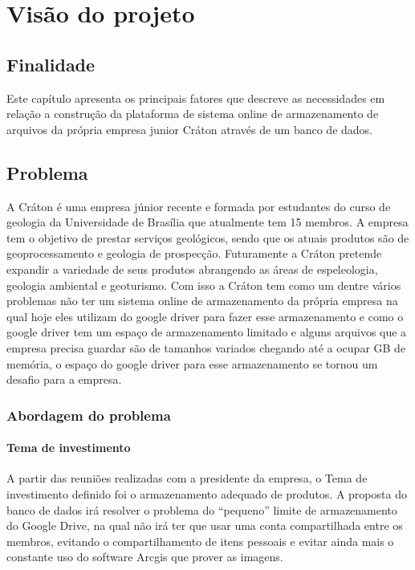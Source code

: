 \chapter{Visão do projeto}

  \label{visao}

\section{Finalidade}

  Este capítulo apresenta os principais fatores que descreve as necessidades em relação a construção da plataforma de sistema online de
  armazenamento de arquivos da própria empresa junior Cráton através de um banco de dados.

\section{Problema}

  A Cráton é uma empresa júnior recente e formada por estudantes do curso de geologia da Universidade de Brasília que atualmente tem 15 membros.
  A empresa tem o objetivo de prestar serviços geológicos, sendo que os atuais produtos são de geoprocessamento e geologia de prospecção.
  Futuramente a Cráton pretende expandir a variedade de seus produtos abrangendo as áreas de espeleologia, geologia ambiental e geoturismo. Com
  isso a Cráton tem como um dentre vários problemas não ter um sistema online de armazenamento da própria empresa na qual hoje eles utilizam do
  google driver para fazer esse armazenamento e como o google driver tem um espaço de armazenamento limitado e alguns arquivos que a empresa
  precisa guardar são de tamanhos variados chegando até a ocupar GB de memória, o espaço do google driver para esse armazenamento se tornou um
  desafio para a empresa.

\subsection{Abordagem do problema}

\subsubsection{Tema de investimento}

  A partir das reuniões realizadas com a presidente da empresa, o Tema de investimento definido foi o armazenamento adequado de produtos. A
  proposta do banco de dados irá resolver o problema do “pequeno” limite de armazenamento do Google Drive, na qual não irá ter que usar uma
  conta compartilhada entre os membros, evitando o compartilhamento de itens pessoais e evitar ainda mais o constante uso do software Arcgis que
  prover as imagens.

